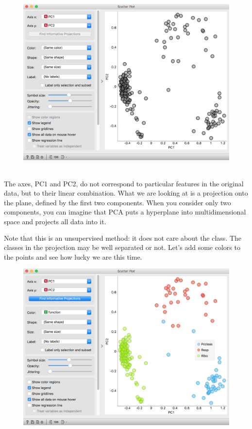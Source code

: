 \begin{figure}[h!]
    \centering
    \includegraphics[width=\linewidth]{scatterplot-gray.png}
    \caption{$\;$}
\end{figure}

\newpage

The axes, PC1 and PC2, do not correspond to particular features in the original data, but to their linear combination. What we are looking at is a projection onto the plane, defined by the first two components. When you consider only two components, you can imagine that PCA puts a hyperplane into multidimensional space and projects all data into it.

Note that this is an unsupervised method: it does not care about the class. The classes in the projection may be well separated or not. Let's add some colors to the points and see how lucky we are this time.

\begin{figure}[h]
    \centering
    \includegraphics[width=\linewidth]{scatterplot-color.png}
    \caption{$\;$}
\end{figure}

